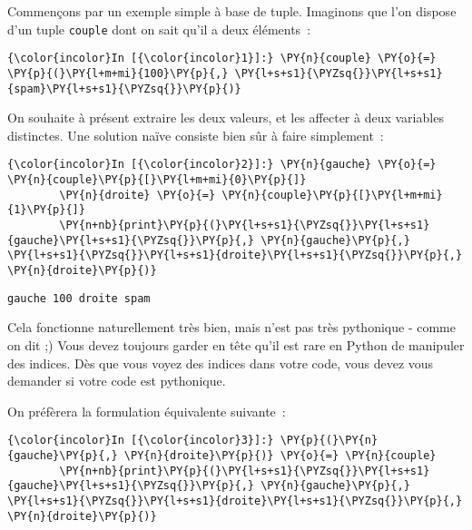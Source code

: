     Commençons par un exemple simple à base de tuple. Imaginons que l'on
dispose d'un tuple \texttt{couple} dont on sait qu'il a deux éléments~:

    \begin{Verbatim}[commandchars=\\\{\},frame=single,framerule=0.3mm,rulecolor=\color{cellframecolor}]
{\color{incolor}In [{\color{incolor}1}]:} \PY{n}{couple} \PY{o}{=} \PY{p}{(}\PY{l+m+mi}{100}\PY{p}{,} \PY{l+s+s1}{\PYZsq{}}\PY{l+s+s1}{spam}\PY{l+s+s1}{\PYZsq{}}\PY{p}{)}
\end{Verbatim}


    On souhaite à présent extraire les deux valeurs, et les affecter à deux
variables distinctes. Une solution naïve consiste bien sûr à faire
simplement~:

    \begin{Verbatim}[commandchars=\\\{\},frame=single,framerule=0.3mm,rulecolor=\color{cellframecolor}]
{\color{incolor}In [{\color{incolor}2}]:} \PY{n}{gauche} \PY{o}{=} \PY{n}{couple}\PY{p}{[}\PY{l+m+mi}{0}\PY{p}{]}
        \PY{n}{droite} \PY{o}{=} \PY{n}{couple}\PY{p}{[}\PY{l+m+mi}{1}\PY{p}{]}
        \PY{n+nb}{print}\PY{p}{(}\PY{l+s+s1}{\PYZsq{}}\PY{l+s+s1}{gauche}\PY{l+s+s1}{\PYZsq{}}\PY{p}{,} \PY{n}{gauche}\PY{p}{,} \PY{l+s+s1}{\PYZsq{}}\PY{l+s+s1}{droite}\PY{l+s+s1}{\PYZsq{}}\PY{p}{,} \PY{n}{droite}\PY{p}{)}
\end{Verbatim}


    \begin{Verbatim}[commandchars=\\\{\},frame=single,framerule=0.3mm,rulecolor=\color{cellframecolor}]
gauche 100 droite spam
\end{Verbatim}

    Cela fonctionne naturellement très bien, mais n'est pas très pythonique
- comme on dit ;) Vous devez toujours garder en tête qu'il est rare en
Python de manipuler des indices. Dès que vous voyez des indices dans
votre code, vous devez vous demander si votre code est pythonique.

On préfèrera la formulation équivalente suivante~:

    \begin{Verbatim}[commandchars=\\\{\},frame=single,framerule=0.3mm,rulecolor=\color{cellframecolor}]
{\color{incolor}In [{\color{incolor}3}]:} \PY{p}{(}\PY{n}{gauche}\PY{p}{,} \PY{n}{droite}\PY{p}{)} \PY{o}{=} \PY{n}{couple}
        \PY{n+nb}{print}\PY{p}{(}\PY{l+s+s1}{\PYZsq{}}\PY{l+s+s1}{gauche}\PY{l+s+s1}{\PYZsq{}}\PY{p}{,} \PY{n}{gauche}\PY{p}{,} \PY{l+s+s1}{\PYZsq{}}\PY{l+s+s1}{droite}\PY{l+s+s1}{\PYZsq{}}\PY{p}{,} \PY{n}{droite}\PY{p}{)}
\end{Verbatim}


